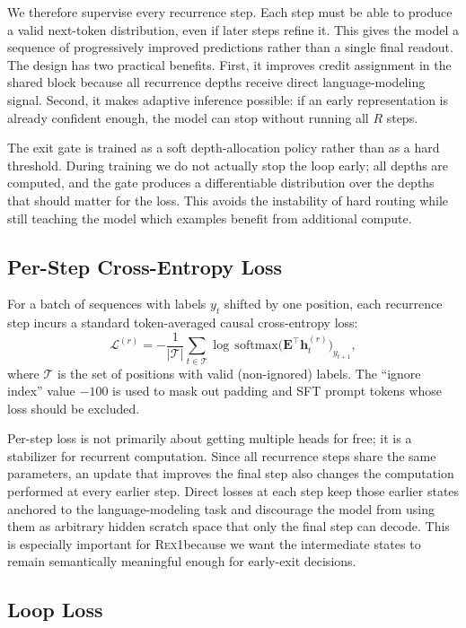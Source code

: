 \documentclass[11pt,a4paper]{article}
\newcommand{\REX}{\textsc{Rex1}\xspace}
\providecommand{\xspace}{}
\begin{document}
We therefore supervise every recurrence step. Each step must be able to produce
a valid next-token distribution, even if later steps refine it. This gives the
model a sequence of progressively improved predictions rather than a single
final readout. The design has two practical benefits. First, it improves credit
assignment in the shared block because all recurrence depths receive direct
language-modeling signal. Second, it makes adaptive inference possible: if an
early representation is already confident enough, the model can stop without
running all $R$ steps.

The exit gate is trained as a soft depth-allocation policy rather than as a hard
threshold. During training we do not actually stop the loop early; all depths are
computed, and the gate produces a differentiable distribution over the depths
that should matter for the loss. This avoids the instability of hard routing
while still teaching the model which examples benefit from additional compute.

\subsection{Per-Step Cross-Entropy Loss}

For a batch of sequences with labels $y_t$ shifted by one position, each
recurrence step incurs a standard token-averaged causal cross-entropy loss:
\begin{equation}
\mathcal{L}^{(r)} = -\frac{1}{|\mathcal{T}|} \sum_{t \in \mathcal{T}}
\log \, \mathrm{softmax}\bigl( \mathbf{E}^\top \mathbf{h}_t^{(r)}\bigr)_{y_{t+1}},
\end{equation}
where $\mathcal{T}$ is the set of positions with valid (non-ignored) labels.
The ``ignore index'' value $-100$ is used to mask out padding and SFT prompt
tokens whose loss should be excluded.

Per-step loss is not primarily about getting multiple heads for free; it is a
stabilizer for recurrent computation. Since all recurrence steps share the same
parameters, an update that improves the final step also changes the computation
performed at every earlier step. Direct losses at each step keep those earlier
states anchored to the language-modeling task and discourage the model from
using them as arbitrary hidden scratch space that only the final step can decode.
This is especially important for \REX because we want the intermediate states to
remain semantically meaningful enough for early-exit decisions.

\subsection{Loop Loss}
\end{document}
